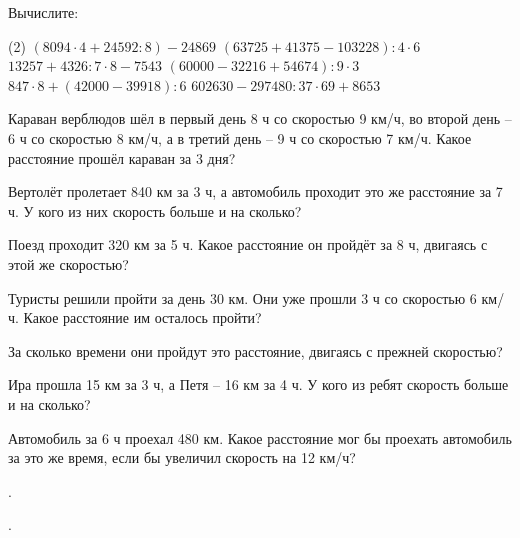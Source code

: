 %

\begin{class}[number=1]
	\begin{listofex}
		\item Вычислите:
		\begin{tasks}(2)
			\task \( ( 8 094 \cdot 4 + 24 592 : 8 ) - 24 869\)
			\task \( ( 63 725 + 41 375 - 103 228 ) : 4 \cdot 6 \)
			\task \( 13 257 + 4 326 : 7 \cdot 8 - 7 543 \)
			\task \( ( 60 000 - 32 216 + 54 674 ) : 9 \cdot 3 \)
			\task \( 847 \cdot 8 + ( 42 000 - 39 918) : 6 \)
			\task \( 602 630 - 297 480 : 37 \cdot 69 + 8 653 \)
		\end{tasks}
		\item Караван верблюдов шёл в первый день 8 ч со скоростью 9 км/ч, во второй день – 6 ч со скоростью 8 км/ч, а в третий день – 9 ч со скоростью 7 км/ч. Какое расстояние прошёл караван за 3 дня?
		\item Вертолёт пролетает 840 км за 3 ч, а автомобиль проходит это же расстояние за 7 ч. У кого из них скорость больше и на сколько?
		\item Поезд проходит 320 км за 5 ч. Какое расстояние он пройдёт за 8 ч, двигаясь с этой же скоростью?
		\item Туристы решили пройти за день 30 км. Они уже прошли 3 ч со скоростью 6 км/ч. Какое расстояние им осталось пройти?
		\item За сколько времени они пройдут это расстояние, двигаясь с прежней скоростью?
		\item Ира прошла 15 км за 3 ч, а Петя – 16 км за 4 ч. У кого из ребят скорость больше и на сколько?
		\item Автомобиль за 6 ч проехал 480 км. Какое расстояние мог бы проехать автомобиль за это же время, если бы увеличил скорость на 12 км/ч?
	\end{listofex}
\end{class}

\begin{class}[number=2]
	\begin{listofex}
		\item .
	\end{listofex}
\end{class}

\begin{homework}[number=1]
	\begin{listofex}
		\item .
	\end{listofex}
\end{homework}


